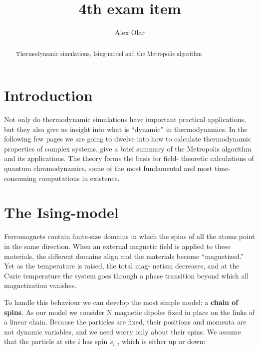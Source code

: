 \documentclass[12pt]{article}
\theoremstyle{plain}
\begin{document}
\title{4th exam item}
\author{Alex Olar}

\maketitle

\newpage
\begin{abstract}
    Thermodynamic simulations, Ising-model and the Metropolis algorithm
\end{abstract}

\vspace{2mm}

\section{Introduction}

\vspace{2mm}

\par Not only do thermodynamic simulations
have important practical applications, but they also give us insight into what is “dynamic” in
thermodynamics. In the following few pages we are going
to dwelve into how to calculate thermodynamic properties of
complex systems, give a brief summary of the Metropolis algorithm and its 
applications. The theory forms the basis for field- theoretic calculations
of quantum chromodynamics, some of the most fundamental and most time-consuming
computations in existence.

\vspace{2mm}

\section{The Ising-model}

\vspace{2mm}

\par Ferromagnets contain finite-size domains in which the spins of all the atoms point in the same
direction. When an external magnetic field is applied to these materials, the different domains
align and the materials become “magnetized.” Yet as the temperature is raised, the total mag-
netism decreases, and at the Curie temperature the system goes through a phase transition
beyond which all magnetization vanishes.

\vspace{2mm}

\par To handle this behaviour we can develop the most simple model: a \textbf{chain of spins}. As our model
we consider N magnetic dipoles fixed in place on the links of a linear chain. Because
the particles are fixed, their positions and momenta are not dynamic variables, and we need
worry only about their spins. We assume that the particle at site $i$ has spin $s_{i}$ , which is either
up or down:
\end{document}
